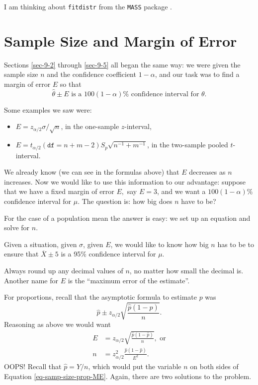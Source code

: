 \documentclass[captions=tableheading]{scrbook}
\begin{document}
I am thinking about \texttt{fitdistr} from the \texttt{MASS} package \cite{Venables2002}.
\section{Sample Size and Margin of Error}
\label{sec-9-7}
\label{sec-Sample-Size-and-MOE}


Sections \ref{sec-9-2} through \ref{sec-9-5} all began the same way: we were given the sample size \(n\) and the confidence coefficient \(1-\alpha\), and our task was to find a margin of error \(E\) so that 
\[
\hat{\theta}\pm E\mbox{ is a }100(1-\alpha)\%\mbox{ confidence interval for }\theta.
\]

Some examples we saw were:
\begin{itemize}
\item \(E=z_{\alpha/2}\sigma/\sqrt{n}\), in the one-sample \(z\)-interval,
\item \(E=t_{\alpha/2}(\mathtt{df}=n+m-2)S_{p}\sqrt{n^{-1}+m^{-1}}\), in the two-sample pooled \(t\)-interval.
\end{itemize}

We already know (we can see in the formulas above) that \(E\) decreases as \(n\) increases. Now we would like to use this information to our advantage: suppose that we have a fixed margin of error \(E,\) say \(E=3\), and we want a \(100(1-\alpha)\%\) confidence interval for \(\mu\). The question is: how big does \(n\) have to be?

For the case of a population mean the answer is easy: we set up an equation and solve for \(n\).

\begin{example}
Given a situation, given \(\sigma\), given \(E\), we would like to know how big \(n\) has to be to ensure that \(\overline{X}\pm5\) is a 95\% confidence interval for \(\mu\).
\end{example}

\begin{rem}
Always round up any decimal values of \(n\), no matter how small the decimal is. Another name for \(E\) is the ``maximum error of the estimate''.
\end{rem}

For proportions, recall that the asymptotic formula to estimate \(p\) was
\[
\hat{p}\pm z_{\alpha/2}\sqrt{\frac{\hat{p}(1-\hat{p})}{n}}.
\]
Reasoning as above we would want
\begin{align}
E & =z_{\alpha/2}\sqrt{\frac{\hat{p}(1-\hat{p})}{n}},\mbox{ or}\\
n & =z_{\alpha/2}^{2}\frac{\hat{p}(1-\hat{p})}{E^{2}}.\label{eq-samp-size-prop-ME}
\end{align}
OOPS! Recall that \(\hat{p}=Y/n\), which would put the variable \(n\) on both sides of Equation \ref{eq-samp-size-prop-ME}. Again, there are two solutions to the problem.
\end{document}
